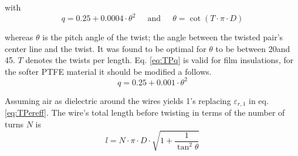 with
\begin{equation}
\label{eq:TPq}
q = 0.25 + 0.0004\cdot \theta^2
\;\;\;\; \textrm{ and } \;\;\;\;
\theta = \cot{\left(T\cdot\pi\cdot D\right)}
\end{equation}

whereas $\theta$ is the pitch angle of the twist; the angle between
the twisted pair's center line and the twist.  It was found to be
optimal for $\theta$ to be between 20\degree and 45\degree.  $T$
denotes the twists per length.  Eq. \eqref{eq:TPq} is valid for film
insulations, for the softer PTFE material it should be modified a
follows.
\begin{equation}
q = 0.25 + 0.001\cdot \theta^2
\end{equation}

Assuming air as dielectric around the wires yields 1's replacing
$\varepsilon_{r,1}$ in eq. \eqref{eq:TPereff}.  The wire's total
length before twisting in terms of the number of turns $N$ is
\begin{equation}
l = N\cdot\pi\cdot D\cdot\sqrt{1 + \dfrac{1}{\tan^2{\theta}}}
\end{equation}
